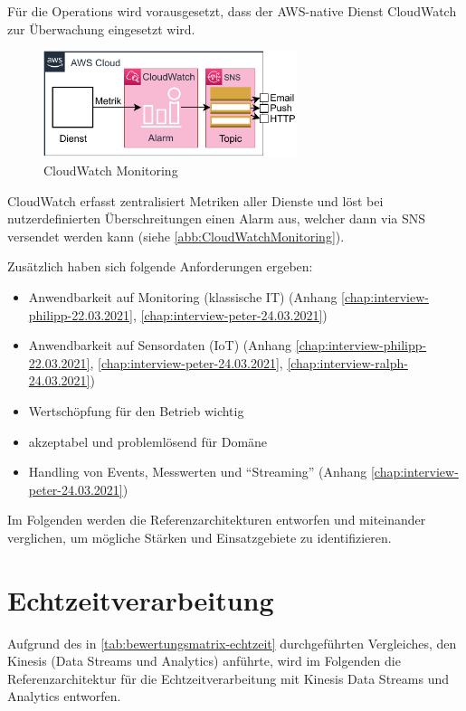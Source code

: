 Für die Operations wird vorausgesetzt, dass der \ac{AWS}-native Dienst CloudWatch zur Überwachung eingesetzt wird. 
\begin{figure}[H]
\centering
\includegraphics[width=0.66\textwidth]{graphics/CloudWatch-Monitoring}
\caption{CloudWatch Monitoring}
\label{abb:CloudWatchMonitoring}
\end{figure}
CloudWatch erfasst zentralisiert Metriken aller Dienste und löst bei nutzerdefinierten Überschreitungen einen Alarm aus, welcher dann via \ac{SNS} versendet werden kann (siehe \autoref{abb:CloudWatchMonitoring}).



Zusätzlich haben sich folgende Anforderungen ergeben:
\begin{itemize}
\item Anwendbarkeit auf Monitoring (klassische IT) (Anhang \ref{chap:interview-philipp-22.03.2021}, \ref{chap:interview-peter-24.03.2021})
\item Anwendbarkeit auf Sensordaten (\ac{IoT}) (Anhang \ref{chap:interview-philipp-22.03.2021}, \ref{chap:interview-peter-24.03.2021}, \ref{chap:interview-ralph-24.03.2021})
\item Wertschöpfung für den Betrieb wichtig
\item akzeptabel und problemlösend für Domäne
\item Handling von Events, Messwerten und \enquote{Streaming} (Anhang \ref{chap:interview-peter-24.03.2021})
\end{itemize}


Im Folgenden werden die Referenzarchitekturen entworfen und miteinander verglichen, um mögliche Stärken und Einsatzgebiete zu identifizieren.

\section{Echtzeitverarbeitung}
Aufgrund des in \autoref{tab:bewertungsmatrix-echtzeit} durchgeführten Vergleiches, den Kinesis (Data Streams und Analytics) anführte, wird im Folgenden die Referenzarchitektur für die Echtzeitverarbeitung mit Kinesis Data Streams und Analytics entworfen. 

